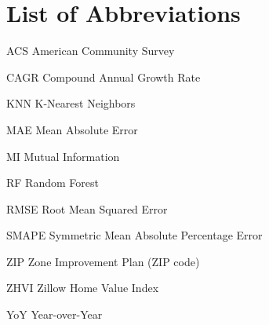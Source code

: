 \chapter*{List of Abbreviations}
\begin{abbrv}
    \item[ACS] American Community Survey
    \item[CAGR] Compound Annual Growth Rate
    \item[KNN] K-Nearest Neighbors
    \item[MAE] Mean Absolute Error
    \item[MI] Mutual Information
    \item[RF] Random Forest
    \item[RMSE] Root Mean Squared Error
    \item[SMAPE] Symmetric Mean Absolute Percentage Error
    \item[ZIP] Zone Improvement Plan (ZIP code)
    \item[ZHVI] Zillow Home Value Index
    \item[YoY] Year-over-Year
\end{abbrv}
